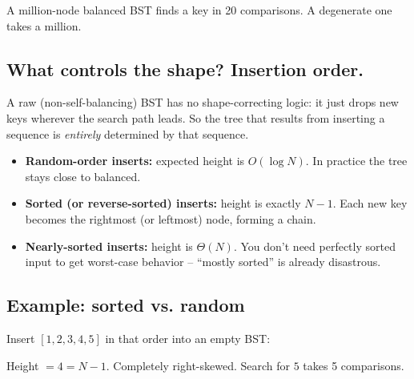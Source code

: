 \documentclass[11pt]{article}
\begin{document}
A million-node balanced BST finds a key in 20 comparisons. A degenerate one takes a million.

\subsection*{What controls the shape? Insertion order.}

A raw (non-self-balancing) BST has no shape-correcting logic: it just drops new keys wherever the search path leads. So the tree that results from inserting a sequence is \emph{entirely} determined by that sequence.

\begin{defnbox}
\begin{itemize}[leftmargin=*]
    \item \textbf{Random-order inserts:} expected height is $O(\log N)$. In practice the tree stays close to balanced.
    \item \textbf{Sorted (or reverse-sorted) inserts:} height is exactly $N - 1$. Each new key becomes the rightmost (or leftmost) node, forming a chain.
    \item \textbf{Nearly-sorted inserts:} height is $\Theta(N)$. You don't need perfectly sorted input to get worst-case behavior -- ``mostly sorted'' is already disastrous.
\end{itemize}
\end{defnbox}

\subsection*{Example: sorted vs. random}

Insert $[1, 2, 3, 4, 5]$ in that order into an empty BST:

\begin{center}
\end{center}

Height $= 4 = N - 1$. Completely right-skewed. Search for $5$ takes 5 comparisons.
\end{document}

